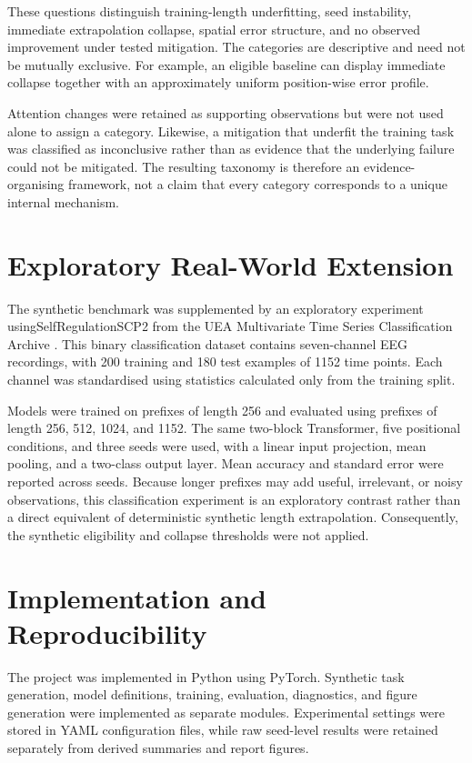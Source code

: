 \documentclass[
    author={Aanchala Ravindra Bhongade},
    supervisor={Dr. Fernando Moreno-Pino},
    degree={MSc},
    title={Length Generalisation in Transformer-Based Sequence Models: Failure Taxonomy and Mitigation Strategies},
    subtitle={},
    type={},
    year={2026}
]{dissertation}
\begin{document}
These questions distinguish training-length underfitting, seed instability, immediate extrapolation collapse, spatial error structure, and no observed improvement under tested mitigation. The categories are descriptive and need not be mutually exclusive. For example, an eligible baseline can display immediate collapse together with an approximately uniform position-wise error profile.

Attention changes were retained as supporting observations but were not used alone to assign a category. Likewise, a mitigation that underfit the training task was classified as inconclusive rather than as evidence that the
underlying failure could not be mitigated. The resulting taxonomy is therefore an evidence-organising framework, not a claim that every category corresponds to a unique internal mechanism.

\section{Exploratory Real-World Extension}
\label{sec:real-world-methodology}

The synthetic benchmark was supplemented by an exploratory experiment usingSelfRegulationSCP2 from the UEA Multivariate Time Series Classification Archive \cite{bagnall2018uea,zerveas2021timeseries}. This binary
classification dataset contains seven-channel EEG recordings, with 200 training and 180 test examples of 1152 time points. Each channel was standardised using statistics calculated only from the training split.

Models were trained on prefixes of length 256 and evaluated using prefixes of length 256, 512, 1024, and 1152. The same two-block Transformer, five positional conditions, and three seeds were used, with a linear input projection, mean pooling, and a two-class output layer. Mean accuracy and standard error were reported across seeds. Because longer prefixes may add useful, irrelevant, or noisy observations, this classification experiment is an exploratory contrast rather than a direct equivalent of deterministic synthetic length extrapolation. Consequently, the synthetic eligibility and collapse thresholds were not applied.

\section{Implementation and Reproducibility}
\label{sec:implementation-compute}

The project was implemented in Python using PyTorch. Synthetic task
generation, model definitions, training, evaluation, diagnostics, and figure generation were implemented as separate modules. Experimental settings were stored in YAML configuration files, while raw seed-level results were retained separately from derived summaries and report figures.
\end{document}
